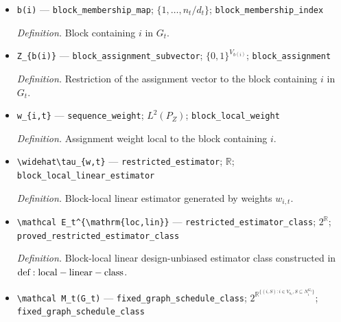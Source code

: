 \documentclass{article}
\begin{document}
\begin{itemize}
  \par\smallskip\noindent\emph{Definition.} In-neighborhood of \(i\) in the fixed graph \(G_t\).
  \item \texttt{b(i)} --- \texttt{block\_\allowbreak{}membership\_\allowbreak{}map}; \(\{1,\ldots,n_t/d_t\}\); \texttt{block\_\allowbreak{}membership\_\allowbreak{}index}
  \par\smallskip\noindent\emph{Definition.} Block containing \(i\) in \(G_t\).
  \item \texttt{Z\_\allowbreak{}\{b(i)\}\allowbreak{}} --- \texttt{block\_\allowbreak{}assignment\_\allowbreak{}subvector}; \(\{0,1\}^{V_{b(i)}}\); \texttt{block\_\allowbreak{}assignment}
  \par\smallskip\noindent\emph{Definition.} Restriction of the assignment vector to the block containing \(i\) in \(G_t\).
  \item \texttt{w\_\allowbreak{}\{i,\allowbreak{}t\}\allowbreak{}} --- \texttt{sequence\_\allowbreak{}weight}; \(L^2(P_Z)\); \texttt{block\_\allowbreak{}local\_\allowbreak{}weight}
  \par\smallskip\noindent\emph{Definition.} Assignment weight local to the block containing \(i\).
  \item \texttt{\textbackslash{}\allowbreak{}widehat\textbackslash{}\allowbreak{}tau\_\allowbreak{}\{w,\allowbreak{}t\}\allowbreak{}} --- \texttt{restricted\_\allowbreak{}estimator}; \(\mathbb R\); \texttt{block\_\allowbreak{}local\_\allowbreak{}linear\_\allowbreak{}estimator}
  \par\smallskip\noindent\emph{Definition.} Block-local linear estimator generated by weights \(w_{i,t}\).
  \item \texttt{\textbackslash{}\allowbreak{}mathcal E\_\allowbreak{}t\textasciicircum{}\{\textbackslash{}\allowbreak{}mathrm\{loc,\allowbreak{}lin\}\allowbreak{}\}\allowbreak{}} --- \texttt{restricted\_\allowbreak{}estimator\_\allowbreak{}class}; \(2^{\mathbb R}\); \texttt{proved\_\allowbreak{}restricted\_\allowbreak{}estimator\_\allowbreak{}class}
  \par\smallskip\noindent\emph{Definition.} Block-local linear design-unbiased estimator class constructed in \({\rm def:local-linear-class}\).
  \item \texttt{\textbackslash{}\allowbreak{}mathcal M\_\allowbreak{}t(G\_\allowbreak{}t)} --- \texttt{fixed\_\allowbreak{}graph\_\allowbreak{}schedule\_\allowbreak{}class}; \(2^{\mathbb R^{\{(i,S):i\in V_{n_t},S\subseteq N_i^{G_t}\}}}\); \texttt{fixed\_\allowbreak{}graph\_\allowbreak{}schedule\_\allowbreak{}class}

\end{itemize}
\end{document}
